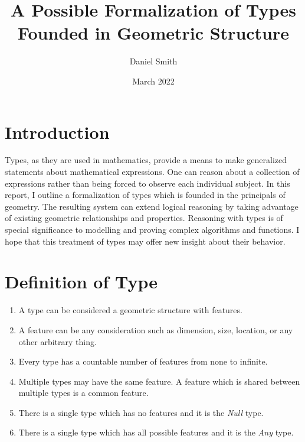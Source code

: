 \documentclass{article}
\title{A Possible Formalization of Types Founded in Geometric Structure}
\author{Daniel Smith}
\date{March 2022}
\begin{document}
\maketitle

\section*{Introduction}
Types, as they are used in mathematics, provide a means to make generalized statements about mathematical expressions.
One can reason about a collection of expressions rather than being forced to observe each individual subject.
In this report, I outline a formalization of types which is founded in the principals of geometry.
The resulting system can extend logical reasoning by taking advantage of existing geometric relationships and properties.
Reasoning with types is of special significance to modelling and proving complex algorithms and functions.
I hope that this treatment of types may offer new insight about their behavior.

\section*{Definition of Type}

\begin{enumerate}
    \item A type can be considered a geometric structure with features.
    \item A feature can be any consideration such as dimension, size, location, or any other arbitrary thing.
    \item Every type has a countable number of features from none to infinite.
    \item Multiple types may have the same feature. A feature which is shared between multiple types is a common feature.
    \item There is a single type which has no features and it is the \textit{Null} type.
    \item There is a single type which has all possible features and it is the \textit{Any} type.
\end{enumerate}
\end{document}

